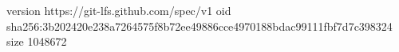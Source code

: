 version https://git-lfs.github.com/spec/v1
oid sha256:3b202420e238a7264575f8b72ee49886cce4970188bdac99111fbf7d7c398324
size 1048672
